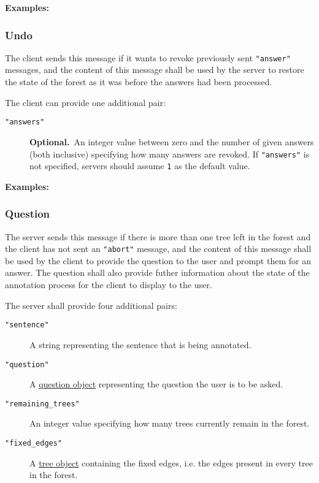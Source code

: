 \documentclass{scrartcl}
\newcommand{\jsstring}[1]{\texttt{\color{OrangeRed}"#1"}}
\newcommand{\js}[1]{\lstinline[style=JSONInputStyle];#1;}
\newcommand{\optional}{\textbf{Optional.}}
\newcommand{\Examples}{\noindent\textbf{Examples:}}
\begin{document}
\Examples



\subsubsection{Undo}
\label{ssub:Undo}

The client sends this message if it wants to revoke previously sent \jsstring{answer} messages,
and the content of this message shall be used by the server to restore the state of the forest as it was before the answers had been processed.

The client can provide one additional pair:
\begin{description}
    \item[\jsstring{answers}] \optional\ An integer value between zero and the number of given answers (both inclusive) specifying how many answers are revoked.
        If \jsstring{answers} is not specified, servers should assume \js{1} as the default value.
\end{description}

\Examples



\subsubsection{Question}
\label{ssub:Question}

The server sends this message if there is more than one tree left in the forest and the client has not sent an \jsstring{abort} message,
and the content of this message shall be used by the client to provide the question to the user and prompt them for an answer.
The question shall also provide futher information about the state of the annotation process for the client to display to the user.

The server shall provide four additional pairs:
\begin{description}
    \item[\jsstring{sentence}] A string representing the sentence that is being annotated.
    \item[\jsstring{question}] A \hyperref[ssub:Question object]{question object} representing the question the user is to be asked.
    \item[\jsstring{remaining\_trees}] An integer value specifying how many trees currently remain in the forest.
    \item[\jsstring{fixed\_edges}] A \hyperref[ssub:Tree object]{tree object} containing the fixed edges, i.e. the edges present in every tree in the forest.
\end{description}
\end{document}
